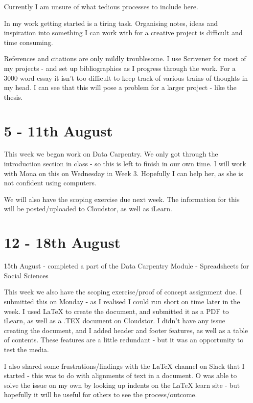 \documentclass{article}
\begin{document}
Currently I am unsure of what tedious processes to include here.

In my work getting started is a tiring task. Organising notes, ideas and inspiration into something I can work with for a creative project is difficult and time consuming.

References and citations are only mildly troublesome. I use Scrivener for most of my projects - and set up bibliographies as I progress through the work. For a 3000 word essay it isn't too difficult to keep track of various trains of thoughts in my head. I can see that this will pose a problem for a larger project - like the thesis.

\section{5 - 11th August}

This week we began work on Data Carpentry. We only got through the introduction section in class - so this is left to finish in our own time. I will work with Mona on this on Wednesday in Week 3. Hopefully I can help her, as she is not confident using computers. 

We will also have the scoping exercise due next week. The information for this will be posted/uploaded to Cloudstor, as well as iLearn.

\section{12 - 18th August}

15th August - completed a part of the Data Carpentry Module - Spreadsheets for Social Sciences

This week we also have the scoping exercise/proof of concept assignment due. I submitted this on Monday - as I realised I could run short on time later in the week. 
I used LaTeX to create the document, and submitted it as a PDF to iLearn, as well as a .TEX document on Cloudstor. 
I didn't have any issue creating the document, and I added header and footer features, as well as a table of contents. These features are a little redundant - but it was an opportunity  to test the media. 

I also shared some frustrations/findings with the LaTeX channel on Slack that I started - this was to do with alignments of text in a document. O was able to solve the issue on my own by looking up indents on the LaTeX learn site - but hopefully it will be useful for others to see the process/outcome.
\end{document}
